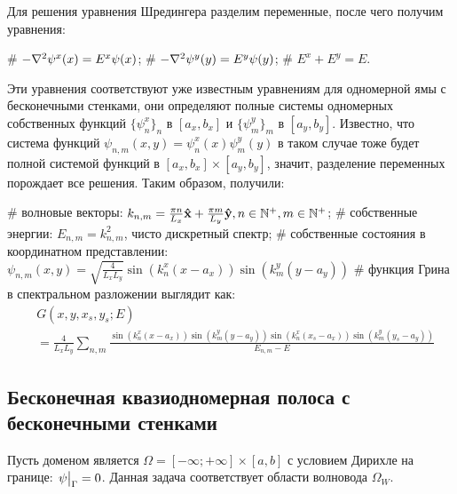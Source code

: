 Для решения уравнения Шредингера разделим переменные, после чего получим уравнения:
\begin{ilist}
# $-\laplacian \psi^x(x) = E^x \psi(x)$;
# $-\laplacian \psi^y(y) = E^y \psi(y)$;
# $E^x + E^y = E$.
\end{ilist}
Эти уравнения соответствуют уже известным уравнениям для одномерной ямы с бесконечными стенками, они определяют полные системы одномерных собственных функций $\{\psi^x_n\}_n$ в $[a_x, b_x]$ и $\{\psi^y_m\}_m$ в $[a_y, b_y]$. Известно, что система функций $\psi_{n, m}(x, y) = \psi_n^x(x) \psi_m^y(y)$ в таком случае тоже будет полной системой функций в $[a_x, b_x] \times [a_y, b_y]$, значит, разделение переменных порождает все решения. Таким образом, получили:

\begin{ilist}
# волновые векторы: $k_{n, m} = \frac{\pi n}{L_x} \vb{\hat{x}} + \frac{\pi m}{L_y} \vb{\hat{y}}, n \in \mathbb{N}^+, m \in \mathbb{N}^+$;
# собственные энергии: $E_{n, m} = k_{n, m}^2$, чисто дискретный спектр;
# собственные состояния в координатном представлении: $\psi_{n, m}(x, y) = \sqrt{\frac{4}{L_x L_y}} \sin(k^x_n (x - a_x)) \sin(k^y_m (y - a_y))$
# функция Грина в спектральном разложении выглядит как:
\begin{align*}
& G(x, y, x_s, y_s; E) \\
& = \frac{4}{L_x L_y} \sum\limits_{n, m} \frac{\sin(k^x_n (x - a_x)) \sin(k^y_m (y - a_y)) \sin(k^x_n (x_s - a_x)) \sin(k^y_m (y_s - a_y))}{E_{n, m} - E}
\end{align*}
\end{ilist}

\subsection{Бесконечная квазиодномерная полоса с бесконечными стенками}
Пусть доменом является $\Omega = [-\infty; +\infty] \times [a, b]$ с условием Дирихле на границе: $\eval{\psi}_{\Gamma} = 0$. Данная задача соответствует области волновода $\Omega_W$.

